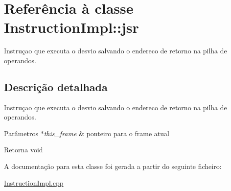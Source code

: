 \hypertarget{class_instruction_impl_1_1jsr}{}\section{Referência à classe Instruction\+Impl\+:\+:jsr}
\label{class_instruction_impl_1_1jsr}


Instruçao que executa o desvio salvando o endereco de retorno na pilha de operandos.  




\subsection{Descrição detalhada}
Instruçao que executa o desvio salvando o endereco de retorno na pilha de operandos. 


\begin{DoxyParams}{Parâmetros}
{\em $\ast$this\+\_\+frame} & ponteiro para o frame atual \\
\hline
\end{DoxyParams}
\begin{DoxyReturn}{Retorna}
void 
\end{DoxyReturn}


A documentação para esta classe foi gerada a partir do seguinte ficheiro\+:\begin{DoxyCompactItemize}
\item 
\hyperlink{_instruction_impl_8cpp}{Instruction\+Impl.\+cpp}\end{DoxyCompactItemize}
